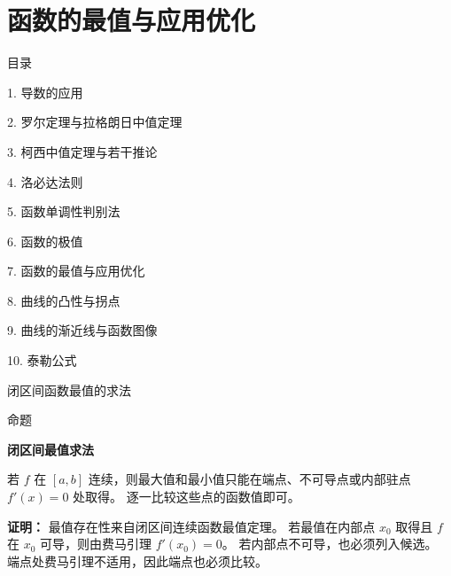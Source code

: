 \documentclass[aspectratio=169,10pt,fontset=fandol]{ctexbeamer}
\begin{document}
\section{函数的最值与应用优化}
\begin{frame}[t,fragile]{目录}
\normalsize
{\color{black}\normalsize 1. 导数的应用\par}\vspace{0.22em}
{\color{black}\normalsize 2. 罗尔定理与拉格朗日中值定理\par}\vspace{0.22em}
{\color{black}\normalsize 3. 柯西中值定理与若干推论\par}\vspace{0.22em}
{\color{black}\normalsize 4. 洛必达法则\par}\vspace{0.22em}
{\color{black}\normalsize 5. 函数单调性判别法\par}\vspace{0.22em}
{\color{black}\normalsize 6. 函数的极值\par}\vspace{0.22em}
{\color{blue}\normalsize 7. 函数的最值与应用优化\par}\vspace{0.22em}
{\color{gray!40}\normalsize 8. 曲线的凸性与拐点\par}\vspace{0.22em}
{\color{gray!40}\normalsize 9. 曲线的渐近线与函数图像\par}\vspace{0.22em}
{\color{gray!40}\normalsize 10. 泰勒公式\par}\vspace{0.22em}
\end{frame}
\begin{frame}[t,fragile]{闭区间函数最值的求法}
\normalsize
\begin{block}{命题}
{\normalsize
\textbf{闭区间最值求法}\par

若 $f$ 在 $[a,b]$ 连续，则最大值和最小值只能在端点、不可导点或内部驻点 $f'(x)=0$ 处取得。 逐一比较这些点的函数值即可。

}
\end{block}
\pause
{\normalsize
\textbf{证明：}
最值存在性来自闭区间连续函数最值定理。 若最值在内部点 $x_0$ 取得且 $f$ 在 $x_0$ 可导，则由费马引理 $f'(x_0)=0$。 若内部点不可导，也必须列入候选。 端点处费马引理不适用，因此端点也必须比较。

}
\end{frame}
\end{document}
